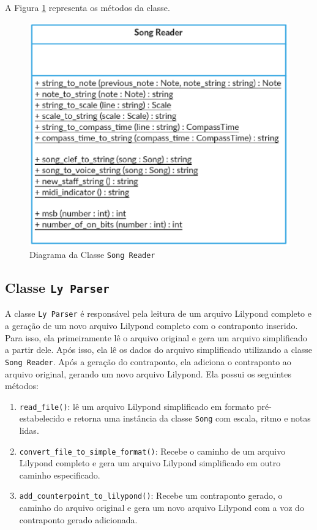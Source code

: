       A Figura \ref{songreaderclass} representa os métodos da classe.

      \begin{figure}[htb]
        \centering
        \includegraphics[scale=0.8]{figuras/songreaderclass.eps}
        \caption{Diagrama da Classe \texttt{Song Reader}}
        \label{songreaderclass}
      \end{figure}

    \subsection[Classe \texttt{Ly Parser}]{Classe \texttt{Ly Parser}}


      A classe \texttt{Ly Parser} é responsável pela leitura de um arquivo Lilypond completo e a geração de um novo arquivo Lilypond completo com o contraponto inserido. Para isso, ela primeiramente lê o arquivo original e gera um arquivo simplificado a partir dele. Após isso, ela lê os dados do arquivo simplificado utilizando a classe \texttt{Song Reader}. Após a geração do contraponto, ela adiciona o contraponto ao arquivo original, gerando um novo arquivo Lilypond. Ela possui os seguintes métodos:

      \begin{enumerate}
        \item \texttt{read\_file()}: lê um arquivo Lilypond simplificado em formato pré-estabelecido e retorna uma instância da classe \texttt{Song} com escala, ritmo e notas lidas.
        \item \texttt{convert\_file\_to\_simple\_format()}: Recebe o caminho de um arquivo Lilypond completo e gera um arquivo Lilypond simplificado em outro caminho especificado.
        \item \texttt{add\_counterpoint\_to\_lilypond()}: Recebe um contraponto gerado, o caminho do arquivo original e gera um novo arquivo Lilypond com a voz do contraponto gerado adicionada.
      \end{enumerate}

